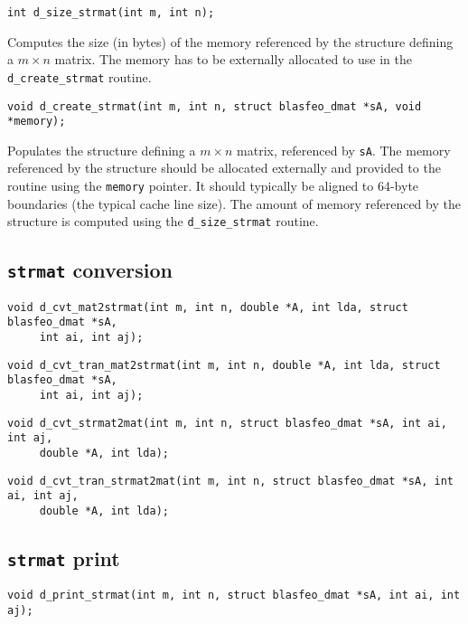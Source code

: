 \documentclass[a4paper]{report}
\begin{document}
\begin{verbatim}
int d_size_strmat(int m, int n);
\end{verbatim}
Computes the size (in bytes) of the memory referenced by the structure defining a $m\times n$ matrix.
The memory has to be externally allocated to use in the {\tt d\_create\_strmat} routine.

\begin{verbatim}
void d_create_strmat(int m, int n, struct blasfeo_dmat *sA, void *memory);
\end{verbatim}
Populates the structure defining a $m\times n$ matrix, referenced by {\tt sA}.
The memory referenced by the structure should be allocated externally and provided to the routine using the {\tt memory} pointer.
It should typically be aligned to 64-byte boundaries (the typical cache line size).
The amount of memory referenced by the structure is computed using the {\tt d\_size\_strmat} routine.



\subsection{{\tt strmat} conversion}

\begin{verbatim}
void d_cvt_mat2strmat(int m, int n, double *A, int lda, struct blasfeo_dmat *sA, 
     int ai, int aj);
\end{verbatim}

\begin{verbatim}
void d_cvt_tran_mat2strmat(int m, int n, double *A, int lda, struct blasfeo_dmat *sA, 
     int ai, int aj);
\end{verbatim}

\begin{verbatim}
void d_cvt_strmat2mat(int m, int n, struct blasfeo_dmat *sA, int ai, int aj, 
     double *A, int lda);
\end{verbatim}

\begin{verbatim}
void d_cvt_tran_strmat2mat(int m, int n, struct blasfeo_dmat *sA, int ai, int aj, 
     double *A, int lda);
\end{verbatim}



\subsection{{\tt strmat} print}

\begin{verbatim}
void d_print_strmat(int m, int n, struct blasfeo_dmat *sA, int ai, int aj);
\end{verbatim}
\end{document}
